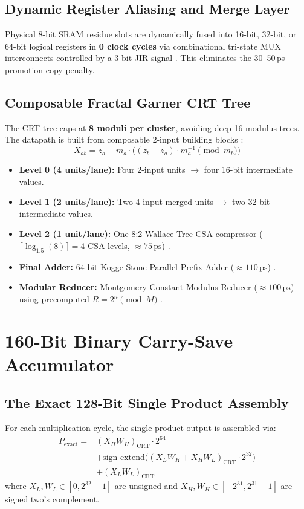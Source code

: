 \documentclass[10pt,journal,compsoc]{IEEEtran}
\begin{document}
\subsection{Dynamic Register Aliasing and Merge Layer}
Physical 8-bit SRAM residue slots are dynamically fused into 16-bit, 32-bit, or 64-bit logical registers in \textbf{0 clock cycles} via combinational tri-state MUX interconnects controlled by a 3-bit JIR signal \cite{arm_sve_ref, intel_sdm_avx512}. This eliminates the 30--50\,ps promotion copy penalty.

\subsection{Composable Fractal Garner CRT Tree}
The CRT tree caps at \textbf{8 moduli per cluster}, avoiding deep 16-modulus trees. The datapath is built from composable 2-input building blocks \cite{garner1959rns}:
\begin{equation}
X_{ab} = z_a + m_a \cdot \Big( (z_b - z_a) \cdot m_a^{-1} \pmod{m_b} \Big)
\end{equation}

\begin{itemize}
    \item \textbf{Level 0 (4 units/lane):} Four 2-input units $\to$ four 16-bit intermediate values.
    \item \textbf{Level 1 (2 units/lane):} Two 4-input merged units $\to$ two 32-bit intermediate values.
    \item \textbf{Level 2 (1 unit/lane):} One 8:2 Wallace Tree CSA compressor ($\lceil \log_{1.5}(8) \rceil = 4$ CSA levels, $\approx 75\,\text{ps}$) \cite{wallace1964multiplier, amd_zen4_hotchips}.
    \item \textbf{Final Adder:} 64-bit Kogge-Stone Parallel-Prefix Adder ($\approx 110\,\text{ps}$) \cite{kogge1973parallel, apple_m2_hotchips}.
    \item \textbf{Modular Reducer:} Montgomery Constant-Modulus Reducer ($\approx 100\,\text{ps}$) using precomputed $R = 2^n \pmod M$ \cite{montgomery1985modular, intel_aes_ni}.
\end{itemize}

\section{160-Bit Binary Carry-Save Accumulator}\label{sec:accumulator}

\subsection{The Exact 128-Bit Single Product Assembly}
For each multiplication cycle, the single-product output is assembled via:
\begin{align}
P_{\text{exact}} = &(X_H W_H)_{\text{CRT}} \cdot 2^{64} \nonumber \\
&+ \text{sign\_extend}\Big( (X_L W_H + X_H W_L)_{\text{CRT}} \cdot 2^{32} \Big) \nonumber \\
&+ (X_L W_L)_{\text{CRT}}
\end{align}
where $X_L, W_L \in [0, 2^{32}-1]$ are unsigned and $X_H, W_H \in [-2^{31}, 2^{31}-1]$ are signed two's complement.
\end{document}
